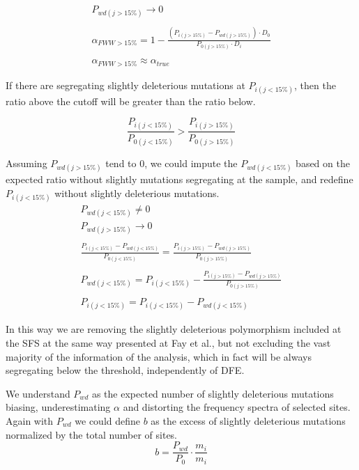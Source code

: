 \documentclass[11pt]{article}
\begin{document}
\begin{equation}
	\begin{gathered}
		P_{wd(j > 15\%)} \to 0\\\\
		\alpha_{FWW > 15\%} = 1 - \frac{(P_{i(j > 15\%)} - P_{wd(j > 15\%)}) \cdot D_{0}}{P_{0(j>15\%)} \cdot D_{i}}\\\\
		\alpha_{FWW > 15\%} \approx \alpha_{true}
	\end{gathered}
\end{equation}

If there are segregating slightly deleterious mutations at $P_{i(j < 15\%)}$, then the ratio above the cutoff will be greater than the ratio below. 

\begin{equation}
		\frac{P_{i(j < 15\%)}}{P_{0(j<15\%)}} > \frac{P_{i(j > 15\%)}}{P_{0(j>15\%)}}		
\end{equation}

Assuming $P_{wd(j>15\%)}$ tend to 0, we could impute the $P_{wd(j<15\%)}$ based on the expected ratio without slightly mutations segregating at the sample, and redefine $P_{i(j<15\%)}$ without slightly deleterious mutations. 
\begin{equation}
	\begin{gathered}
		P_{wd(j < 15\%)} \ne 0\\
		P_{wd(j > 15\%)} \to 0\\\\
		\frac{P_{i(j < 15\%)} - P_{wd(j < 15\%)}}{P_{0(j<15\%)}} = \frac{P_{i(j > 15\%)} - P_{wd(j > 15\%)}}{P_{0(j>15\%)}}\\\\
		P_{wd(j < 15\%)} = P_{i(j < 15\%)} - \frac{P_{i(j > 15\%)} - P_{wd(j > 15\%)}}{P_{0(j>15\%)}}\\\\
		P_{i(j < 15\%)} = P_{i(j < 15\%)} - P_{wd(j < 15\%)}
	\end{gathered}
\end{equation}

In this way we are removing the slightly deleterious polymorphism included at the SFS at the same way presented at Fay et al., but not excluding the vast majority of the information of the analysis, which in fact will be always segregating below the threshold, independently of DFE. 

We understand $P_{wd}$ as the expected number of slightly deleterious mutations biasing,  underestimating $\alpha$ and distorting the frequency spectra of selected sites. Again with $P_{wd}$ we could define $b$ as the excess of slightly deleterious mutations normalized by the total number of sites. 
\begin{equation}
	b = \frac{P_{wd}}{P_{0}} \cdot \frac{m_{i}}{m_{i}}
\end{equation}
\end{document}
